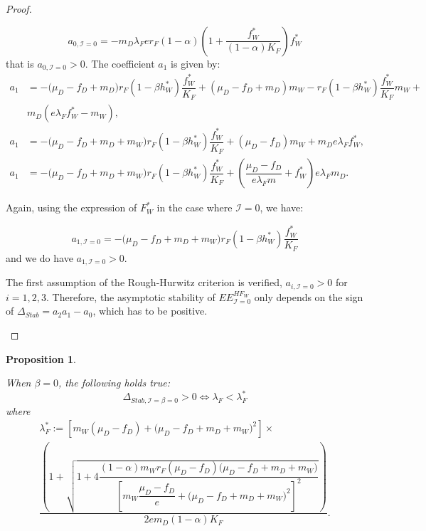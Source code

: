 \documentclass{article}
\newcommand{\lfw}{\lambda_{F}}
\newcommand{\lfw}{\lambda_{F}}
\newcommand{\cI}{\mathcal{I}}
\newtheorem{prop}[theorem]{Proposition}
\theoremstyle{definition}
\theoremstyle{remark}
\begin{document}
\begin{proof}
\begin{itemize}
\begin{equation*}
a_{0, \cI=0} = -m_D \lfw e r_F  (1- \alpha) \left(1 + \dfrac{f_W^*}{(1 - \alpha)K_F}\right) f_W^* 
\end{equation*}
that is $a_{0, \cI=0}>0$. The coefficient $a_1$ is given by:
\begin{subequations}
\begin{align}
a_1 &= - \big( \mu_D  -f_D + m_D) r_F(1 - \beta h_W^*) \dfrac{f^*_W}{K_F} + (\mu_D -f_D + m_D) m_W - r_F(1 - \beta h_W^*) \dfrac{f_W^*}{K_F} m_W + \\ \nonumber &m_D (e\lfw f^*_W - m_W), \\
a_1 &= - \big( \mu_D-f_D + m_D + m_W) r_F(1 - \beta h_W^*) \dfrac{f^*_W}{K_F} + (\mu_D -f_D) m_W  + m_D e\lfw f^*_W, \\
a_1 &= -\big( \mu_D  -f_D + m_D + m_W) r_F(1 - \beta h_W^*) \dfrac{f^*_W}{K_F} + \left(\dfrac{\mu_D -f_D}{e\lfw m} + f_W^*\right) e \lfw m_D . \label{equation:coefficient a1}
\end{align}
\end{subequations}

Again, using the expression of $F^*_W$ in the case where $\cI = 0$, we have:

\begin{equation*}
a_{1, \cI =0} = -\big( \mu_D  -f_D + m_D + m_W) r_F(1 - \beta h_W^*) \dfrac{f^*_W}{K_F}
\end{equation*}
and we do have $a_{1, \cI =0} > 0$.

The first assumption of the Rough-Hurwitz criterion is verified, $a_{i, \cI =0} > 0$ for $i=1,2,3$. Therefore, the asymptotic stability of $EE^{HF_W}_{\cI =0}$ only depends on the sign of $\Delta_{Stab}= a_2 a_1 - a_0$, which has to be positive. 
\end{itemize}
\end{proof}


\begin{prop} \label{prop:stab, cI=beta=0}

When $\beta = 0$, the following holds true:
$$ \Delta_{Stab, \cI = \beta = 0} > 0 \Leftrightarrow \lfw < \lfw^*$$
where 
\begin{multline*}
\lfw^* := \left[m_{W}(\mu_{D}-f_{D})+\big(\mu_{D}-f_{D}+m_{D}+m_{W})^{2}\right] \times \\
 \dfrac{\left(1+\sqrt{1+4\dfrac{(1-\alpha)m_{W}r_{F}\left(\mu_{D}-f_{D}\right)\big(\mu_{D}-f_{D}+m_{D}+m_{W})}{\left[m_{W}\dfrac{\mu_{D}-f_{D}}{e}+\big(\mu_{D}-f_{D}+m_{D}+m_{W})^{2}\right]^{2}}}\right)}{2em_D (1-\alpha) K_F }.
\end{multline*}
\end{prop}
\end{document}
